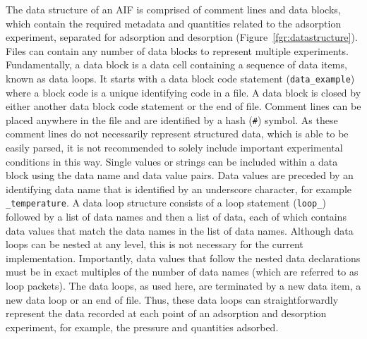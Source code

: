 \documentclass[journal=langd5,manuscript=article]{achemso}
\begin{document}
The data structure of an AIF is comprised of comment lines and data blocks, which contain the required metadata and quantities related to the adsorption experiment, separated for adsorption and desorption (Figure~\ref{fgr:datastructure}).
Files can contain any number of data blocks to represent multiple experiments.
Fundamentally, a data block is a data cell containing a sequence of data items, known as data loops.
It starts with a data block code statement (\texttt{data\_example}) where a block code is a unique identifying code in a file.
A data block is closed by either another data block code statement or the end of file.
Comment lines can be placed anywhere in the file and are identified by a hash (\texttt{\#}) symbol.
As these comment lines do not necessarily represent structured data, which is able to be easily parsed, it is not recommended to solely include important experimental conditions in this way.
Single values or strings can be included within a data block using the data name and data value pairs.
Data values are preceded by an identifying data name that is identified by an underscore character, for example \texttt{\_temperature}.
A data loop structure consists of a loop statement (\texttt{loop\_}) followed by a list of data names and then a list of data, each of which contains data values that match the data names in the list of data names. 
Although data loops can be nested at any level, this is not necessary for the current implementation.
Importantly, data values that follow the nested data declarations must be in exact multiples of the number of data names (which are referred to as loop packets).
The data loops, as used here, are terminated by a new data item, a new data loop or an end of file.
Thus, these data loops can straightforwardly represent the data recorded at each point of an adsorption and desorption experiment, for example, the pressure and quantities adsorbed.
\end{document}
